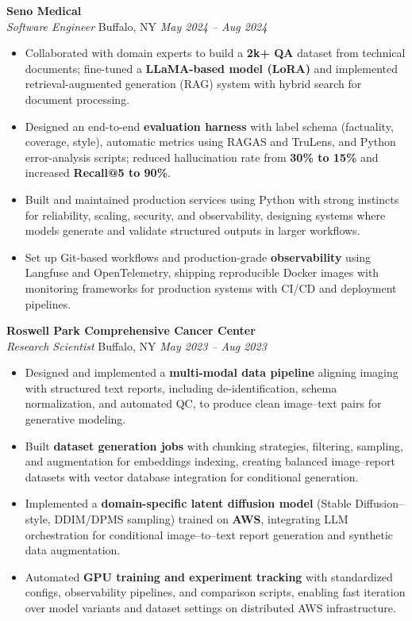 \vspace*{-1pt}
\item \textbf{Seno Medical}\\
\textit{Software Engineer} \hfill Buffalo, NY \quad \textit{May 2024 -- Aug 2024}
\vspace*{-3pt}
\begin{itemize}[leftmargin=0.2in, topsep=1pt]
  \item Collaborated with domain experts to build a \textbf{2k+ QA} dataset from technical documents; fine-tuned a \textbf{LLaMA-based model (LoRA)} and implemented retrieval-augmented generation (RAG) system with hybrid search for document processing.
  \item Designed an end-to-end \textbf{evaluation harness} with label schema (factuality, coverage, style), automatic metrics using RAGAS and TruLens, and Python error-analysis scripts; reduced hallucination rate from \textbf{30\% to 15\%} and increased \textbf{Recall@5 to 90\%}.
  \item Built and maintained production services using Python with strong instincts for reliability, scaling, security, and observability, designing systems where models generate and validate structured outputs in larger workflows.
  \item Set up Git-based workflows and production-grade \textbf{observability} using Langfuse and OpenTelemetry, shipping reproducible Docker images with monitoring frameworks for production systems with CI/CD and deployment pipelines.
\end{itemize}

\vspace*{-1pt}
\item \textbf{Roswell Park Comprehensive Cancer Center}\\
\textit{Research Scientist} \hfill Buffalo, NY \quad \textit{May 2023 -- Aug 2023}
\vspace*{-3pt}
\begin{itemize}[leftmargin=0.2in, topsep=1pt]
  \item Designed and implemented a \textbf{multi-modal data pipeline} aligning imaging with structured text reports, including de-identification, schema normalization, and automated QC, to produce clean image–text pairs for generative modeling.
  \item Built \textbf{dataset generation jobs} with chunking strategies, filtering, sampling, and augmentation for embeddings indexing, creating balanced image–report datasets with vector database integration for conditional generation.
  \item Implemented a \textbf{domain-specific latent diffusion model} (Stable Diffusion–style, DDIM/DPMS sampling) trained on \textbf{AWS}, integrating LLM orchestration for conditional image–to–text report generation and synthetic data augmentation.
  \item Automated \textbf{GPU training and experiment tracking} with standardized configs, observability pipelines, and comparison scripts, enabling fast iteration over model variants and dataset settings on distributed AWS infrastructure.
\end{itemize}
